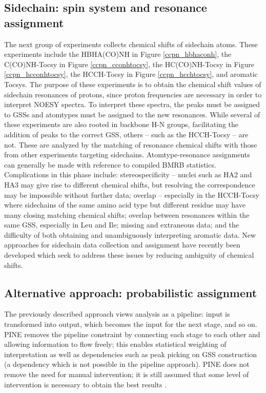 \subsection*{Sidechain: spin system and resonance assignment}
The next group of experiments collects chemical shifts of sidechain atoms.  
These experiments include 
the HBHA(CO)NH \cite{hbhaconh} in Figure \ref{ccpn_hbhaconh}, 
the C(CO)NH-Tocsy \cite{cconhtocsy} in Figure \ref{ccpn_cconhtocsy}, 
the HC(CO)NH-Tocsy \cite{hcconhtocsy} in Figure \ref{ccpn_hcconhtocsy}, 
the HCCH-Tocsy \cite{hcchtocsy} in Figure \ref{ccpn_hcchtocsy}, 
and aromatic Tocsys.  The purpose of these experiments is to 
obtain the chemical shift values of sidechain resonances of protons, since 
proton frequencies are necessary in order to interpret NOESY spectra.  To 
interpret these spectra, the peaks must be assigned to GSSs and atomtypes 
must be assigned to the new resonances. While several of these experiments 
are also rooted in backbone H-N groups, facilitating the addition of peaks 
to the correct GSS, others -- such as the HCCH-Tocsy -- are not.  These are 
analyzed by the matching of resonance chemical shifts with those from other 
experiments targeting sidechains.  Atomtype-resonance assignments can generally 
be made with reference to compiled BMRB statistics.  Complications in this 
phase include: stereospecificity -- nuclei such as HA2 and HA3 may give rise 
to different chemical shifts, but resolving the correspondence may be 
impossible without further data; overlap -- especially in the HCCH-Tocsy 
where sidechains of the same amino acid type but different residue may have 
many closing matching chemical shifts; overlap between resonances within the 
same GSS, especially in Leu and Ile; missing and extraneous data; and the 
difficulty of both obtaining and unambiguously interpreting aromatic data.  
New approaches for sidechain data collection and assignment have recently 
been developed \cite{mobli2010non, hiller2008apsy} which seek to address 
these issues by reducing ambiguity of chemical shifts.

\subsection*{Alternative approach: probabilistic assignment}
The previously described approach views analysis as a pipeline: input is 
transformed into output, which becomes the input for the next stage, and so on.  
PINE \cite{pine} removes the pipeline constraint by connecting each stage to 
each other and allowing information to flow freely; this enables statistical 
weighting of interpretation as well as dependencies such as peak picking 
on GSS construction (a dependency which is not possible in the pipeline 
approach).  PINE does not remove the need for manual intervention; it is
still assumed that some level of intervention is necessary to obtain the
best results \cite{pine}.


